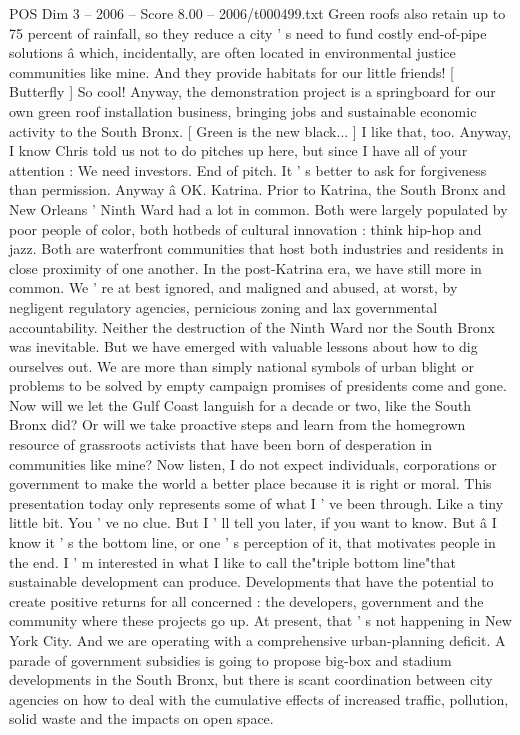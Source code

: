 \begin{textsample}{POS Dim 3 – 2006 – Score 8.00 – 2006/t000499.txt}
Green roofs also retain up to 75 percent of rainfall, so they reduce a city ' s need to fund costly end-of-pipe solutions â which, incidentally, are often located in environmental justice communities like mine.
And they provide habitats for our little friends! [ Butterfly ] So cool!
Anyway, the demonstration project is a springboard for our own green roof installation business, bringing jobs and sustainable economic activity to the South Bronx. [ Green is the new black... ] I like that, too.
Anyway, I know Chris told us not to do pitches up here, but since I have all of your attention : We need investors.
End of pitch.
It ' s better to ask for forgiveness than permission.
Anyway â OK.
Katrina.
Prior to Katrina, the South Bronx and New Orleans ' Ninth Ward had a lot in common.
Both were largely populated by poor people of color, both hotbeds of cultural innovation : think hip-hop and jazz.
Both are waterfront communities that host both industries and residents in close proximity of one another.
In the post-Katrina era, we have still more in common.
We ' re at best ignored, and maligned and abused, at worst, by negligent regulatory agencies, pernicious zoning and lax governmental accountability.
Neither the destruction of the Ninth Ward nor the South Bronx was inevitable.
But we have emerged with valuable lessons about how to dig ourselves out.
We are more than simply national symbols of urban blight or problems to be solved by empty campaign promises of presidents come and gone.
Now will we let the Gulf Coast languish for a decade or two, like the South Bronx did?
Or will we take proactive steps and learn from the homegrown resource of grassroots activists that have been born of desperation in communities like mine?
Now listen, I do not expect individuals, corporations or government to make the world a better place because it is right or moral.
This presentation today only represents some of what I ' ve been through.
Like a tiny little bit.
You ' ve no clue.
But I ' ll tell you later, if you want to know.
But â I know it ' s the bottom line, or one ' s perception of it, that motivates people in the end.
I ' m interested in what I like to call the"triple bottom line"that sustainable development can produce.
Developments that have the potential to create positive returns for all concerned : the developers, government and the community where these projects go up.
At present, that ' s not happening in New York City.
And we are operating with a comprehensive urban-planning deficit.
A parade of government subsidies is going to propose big-box and stadium developments in the South Bronx, but there is scant coordination between city agencies on how to deal with the cumulative effects of increased traffic, pollution, solid waste and the impacts on open space.

\end{textsample}
